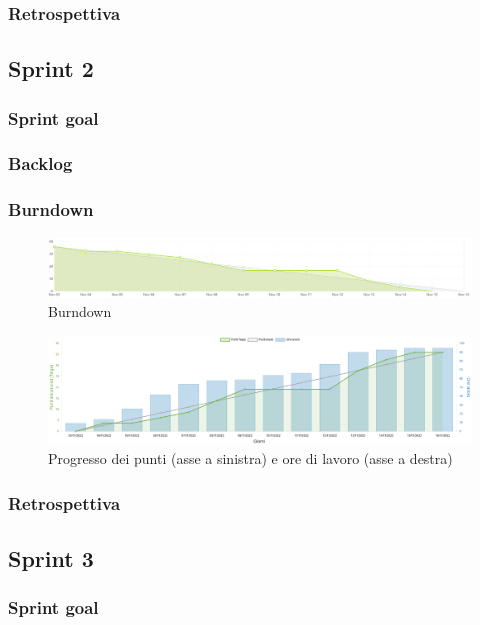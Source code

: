 \documentclass[11pt]{article}
\begin{document}
\subsubsection{Retrospettiva}


\subsection{Sprint 2}
\subsubsection{Sprint goal}

\subsubsection{Backlog}

\subsubsection{Burndown}
\begin{figure}[H]
    \centering
    \includegraphics[width=12cm]{./img/sprint2/burndown.png}
    \caption{Burndown}
\end{figure}
\begin{figure}[H]
    \centering
    \includegraphics[width=12cm]{./img/sprint2/worktime.png}
    \caption{Progresso dei punti (asse a sinistra) e ore di lavoro (asse a destra)}
\end{figure}

\subsubsection{Retrospettiva}


\subsection{Sprint 3}
\subsubsection{Sprint goal}
\end{document}
